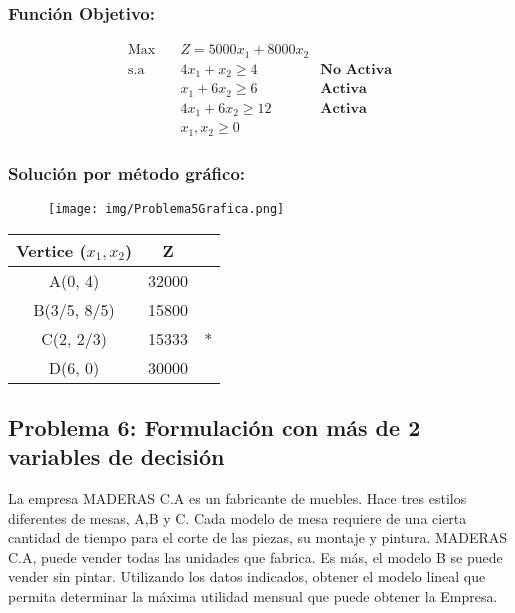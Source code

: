 \documentclass{templateNote}
\begin{document}
\subsubsection*{Función Objetivo:}
\begin{equation*}
    \begin{aligned}
        \text{Max} \quad & Z = 5000x_1 + 8000x_2 \\
        \text{s.a} \quad & 4x_1 + x_2 \geq 4 \quad &\textbf{No Activa} \\
        & x_1 + 6x_2 \geq 6 \quad &\textbf{Activa} \\
        & 4x_1 + 6x_2 \geq 12 \quad &\textbf{Activa} \\
        & x_1, x_2 \geq 0
    \end{aligned}
\end{equation*}

\subsubsection*{Solución por método gráfico:}
\begin{figure}[H]
    \centering
    \texttt{[image: img/Problema5Grafica.png]}
\end{figure}

\begin{center}
    \begin{tabular}{|c|c|c|}
        \hline
        \textbf{Vertice ($x_1,x_2$)} & Z &  \\ \hline
        A(0, 4) & 32000 & \\ \hline
        B(3/5, 8/5) & 15800 & \\ \hline
        C(2, 2/3) & 15333 & * \\ \hline
        D(6, 0) & 30000 & \\ \hline
    \end{tabular}
\end{center}

\subsection*{Problema 6: Formulación con más de 2 variables de decisión}
La empresa MADERAS C.A es un fabricante de muebles. Hace tres estilos diferentes de mesas, A,B y C. Cada modelo de mesa requiere de una cierta cantidad de tiempo para el corte de las piezas, su montaje y pintura. MADERAS C.A, puede vender todas las unidades que fabrica. Es más, el modelo B se puede vender sin pintar. Utilizando los datos indicados, obtener el modelo lineal que permita determinar la máxima utilidad mensual que puede obtener la Empresa.
\end{document}
